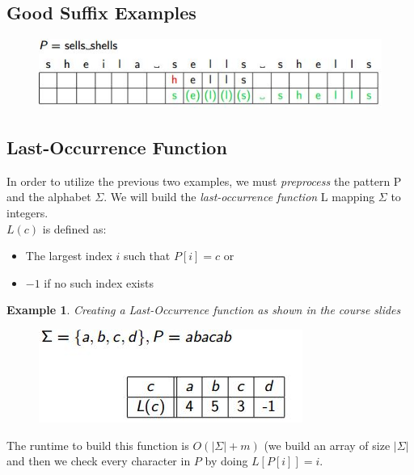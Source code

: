 \documentclass{report}
\newtheorem{ex}{Example}[section]
\begin{document}
\subsection{Good Suffix Examples}
\begin{figure}[ht]
\begin{center}
\includegraphics[scale=0.8]{BM2.jpg}
\end{center}
\end{figure}
\subsection{Last-Occurrence Function}
In order to utilize the previous two examples, we must \textit{preprocess} the pattern P and the alphabet $\Sigma$. We will build the \textit{last-occurrence function} L mapping $\Sigma$ to integers.\\
$L(c)$ is defined as:
\begin{itemize}
\item The largest index $i$ such that $P[i] = c$ or
\item $-1$ if no such index exists
\end{itemize}
\begin{ex}
Creating a Last-Occurrence function as shown in the course slides
\end{ex}
\begin{figure}[ht]
\begin{center}
\includegraphics[scale=0.8]{lof.jpg}
\end{center}
\end{figure}
The runtime to build this function is $O(|\Sigma| + m)$ (we build an array of size $|\Sigma|$ and then we check every character in $P$ by doing $L[P[i]] = i$.
\end{document}

